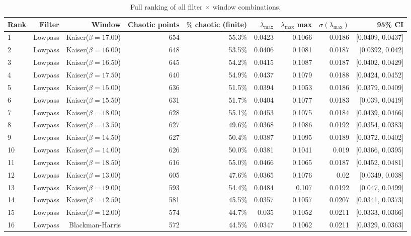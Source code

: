   \begin{longtable}{lrrrrrrrr}
    \caption{Full ranking of all filter $\times$ window combinations.} \\
    \toprule
    Rank & Filter & Window & Chaotic points & $\%$ chaotic (finite) & $\overline{\lambda}_{\max}$ & $\lambda_{\max}$ max & $\sigma(\lambda_{\max})$ & 95\% CI \\
    \midrule
    1 & Lowpass & Kaiser($\beta=17.00$) & 654 & 55.3\% & 0.0423 & 0.1066 & 0.0186 & [0.0409, 0.0437] \\
    2 & Lowpass & Kaiser($\beta=16.00$) & 648 & 53.5\% & 0.0406 & 0.1081 & 0.0187 & [0.0392, 0.042] \\
    3 & Lowpass & Kaiser($\beta=16.50$) & 645 & 54.2\% & 0.0415 & 0.1087 & 0.0187 & [0.0402, 0.0429] \\
    4 & Lowpass & Kaiser($\beta=17.50$) & 640 & 54.9\% & 0.0437 & 0.1079 & 0.0188 & [0.0424, 0.0452] \\
    5 & Lowpass & Kaiser($\beta=15.00$) & 636 & 51.5\% & 0.0394 & 0.1053 & 0.0186 & [0.0379, 0.0409] \\
    6 & Lowpass & Kaiser($\beta=15.50$) & 631 & 51.7\% & 0.0404 & 0.1077 & 0.0183 & [0.039, 0.0419] \\
    7 & Lowpass & Kaiser($\beta=18.00$) & 628 & 55.1\% & 0.0453 & 0.1075 & 0.0184 & [0.0439, 0.0466] \\
    8 & Lowpass & Kaiser($\beta=13.50$) & 627 & 49.6\% & 0.0368 & 0.1086 & 0.0192 & [0.0354, 0.0383] \\
    9 & Lowpass & Kaiser($\beta=14.50$) & 627 & 50.4\% & 0.0387 & 0.1095 & 0.0189 & [0.0372, 0.0402] \\
    10 & Lowpass & Kaiser($\beta=14.00$) & 626 & 50.0\% & 0.0381 & 0.1041 & 0.019 & [0.0366, 0.0395] \\
    11 & Lowpass & Kaiser($\beta=18.50$) & 616 & 55.0\% & 0.0466 & 0.1065 & 0.0187 & [0.0452, 0.0481] \\
    12 & Lowpass & Kaiser($\beta=13.00$) & 605 & 47.6\% & 0.0365 & 0.1076 & 0.02 & [0.0349, 0.038] \\
    13 & Lowpass & Kaiser($\beta=19.00$) & 593 & 54.4\% & 0.0484 & 0.107 & 0.0192 & [0.047, 0.0499] \\
    14 & Lowpass & Kaiser($\beta=12.50$) & 581 & 45.5\% & 0.0357 & 0.1057 & 0.0207 & [0.0341, 0.0373] \\
    15 & Lowpass & Kaiser($\beta=12.00$) & 574 & 44.7\% & 0.035 & 0.1052 & 0.0211 & [0.0333, 0.0366] \\
    16 & Lowpass & Blackman-Harris & 572 & 44.5\% & 0.0347 & 0.1062 & 0.0211 & [0.0329, 0.0363] \\

\end{longtable}
